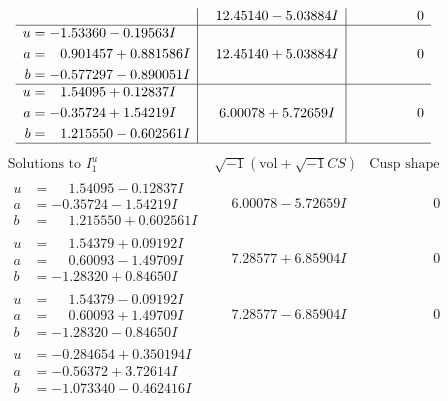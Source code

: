 \documentclass[1p]{elsarticle_modified}
\theoremstyle{definition}
\newcommand{\I}{\sqrt{-1}}
\begin{document}
$$\begin{array}{c|c|c}
 & \phantom{-}12.45140 - 5.03884 I & \phantom{-0.000000 } 0 \\ \hline\begin{aligned}
u &= -1.53360 - 0.19563 I \\
a &= \phantom{-}0.901457 + 0.881586 I \\
b &= -0.577297 - 0.890051 I\end{aligned}
 & \phantom{-}12.45140 + 5.03884 I & \phantom{-0.000000 } 0 \\ \hline\begin{aligned}
u &= \phantom{-}1.54095 + 0.12837 I \\
a &= -0.35724 + 1.54219 I \\
b &= \phantom{-}1.215550 - 0.602561 I\end{aligned}
 & \phantom{-}6.00078 + 5.72659 I & \phantom{-0.000000 } 0\\
 \hline 
 \end{array}$$\newpage$$\begin{array}{c|c|c}  
\text{Solutions to }I^u_{1}& \I (\text{vol} + \sqrt{-1}CS) & \text{Cusp shape}\\
 \hline 
\begin{aligned}
u &= \phantom{-}1.54095 - 0.12837 I \\
a &= -0.35724 - 1.54219 I \\
b &= \phantom{-}1.215550 + 0.602561 I\end{aligned}
 & \phantom{-}6.00078 - 5.72659 I & \phantom{-0.000000 } 0 \\ \hline\begin{aligned}
u &= \phantom{-}1.54379 + 0.09192 I \\
a &= \phantom{-}0.60093 - 1.49709 I \\
b &= -1.28320 + 0.84650 I\end{aligned}
 & \phantom{-}7.28577 + 6.85904 I & \phantom{-0.000000 } 0 \\ \hline\begin{aligned}
u &= \phantom{-}1.54379 - 0.09192 I \\
a &= \phantom{-}0.60093 + 1.49709 I \\
b &= -1.28320 - 0.84650 I\end{aligned}
 & \phantom{-}7.28577 - 6.85904 I & \phantom{-0.000000 } 0 \\ \hline\begin{aligned}
u &= -0.284654 + 0.350194 I \\
a &= -0.56372 + 3.72614 I \\
b &= -1.073340 - 0.462416 I\end{aligned}

\end{array}$$
\end{document}
